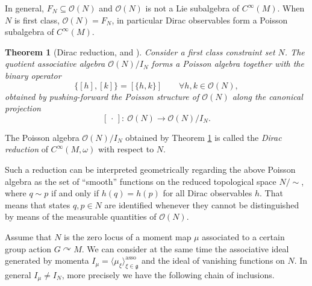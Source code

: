 \documentclass[pdftex]{sigma}
\numberwithin{equation}{section}
\newtheorem{Theorem}{Theorem}[section]
\DeclareMathOperator{\action}{\curvearrowright}
\renewcommand{\subset}{\subseteq}
\begin{document}
\begin{Remark}
	In general, $F_N \subset \mathcal{O}(N)$ and $\mathcal{O}(N)$ is not a Lie subalgebra of $C^\infty(M)$.
	When $N$ is first class, $\mathcal{O}(N)= F_N$, in particular Dirac observables form a Poisson subalgebra of $C^\infty(M)$.
\end{Remark}

\begin{Theorem}[Dirac reduction, {\cite{Dirac64} and \cite[Proposition~3.1]{ArmsGotayJennings90}}]\label{thm:Dirac}
	Consider a first class constraint set $N$.
	The quotient associative algebra $\mathcal{O}(N)/I_N$ forms a Poisson algebra together with the binary operator
	\begin{displaymath}
		\lbrace [h], [k] \rbrace = [\lbrace h, k \rbrace] \qquad \forall h,k \in \mathcal{O}(N),
	\end{displaymath}
	obtained by pushing-forward the Poisson structure of $\mathcal{O}(N)$ along the canonical projection
\[
[\,\cdot\,]\colon \ \mathcal{O}(N) \to \mathcal{O}(N)/I_N.
\]
\end{Theorem}

\begin{Definition}
	The Poisson algebra $\mathcal{O}(N)/I_N$ obtained by Theorem \ref{thm:Dirac} is called the \emph{Dirac reduction} of $C^\infty(M,\omega)$ with respect to $N$.
\end{Definition}	

Such a reduction can be interpreted geometrically regarding the above Poisson algebra as the set of ``smooth'' functions on the reduced topological space $N/{\sim}$, where $q\sim p$ if and only if $h(q)=h(p)$ for all Dirac observables $h$.
That means that states $q,p\in N$ are identified whenever they cannot be distinguished by means of the measurable quantities of $\mathcal{O}(N)$.

Assume that $N$ is the zero locus of a moment map $\mu$ associated to a certain group action $G\action M$.
We can consider at the same time the associative ideal generated by momenta $I_{\mu}=\langle \mu_\xi \rangle_{\xi \in \mathfrak{g}}^{\text{asso}}$ and the ideal of vanishing functions on $N$.
In general $I_{\mu}\neq I_{N}$, more precisely we have the following chain of inclusions.
\end{document}
